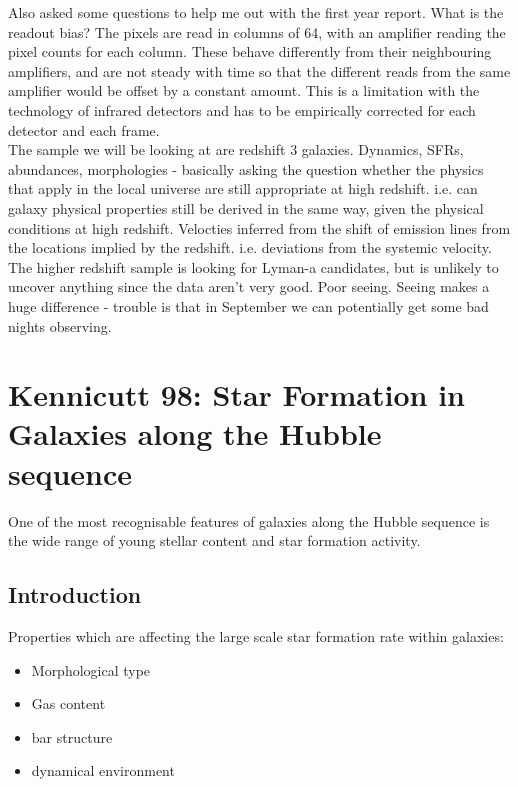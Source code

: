 \documentclass{literature}
\begin{document}
Also asked some questions to help me out with the first year report. What is the readout bias? The pixels are read in columns of 64, with an amplifier reading the pixel counts for each column. These behave differently from their neighbouring amplifiers, and are not steady with time so that the different reads from the same amplifier would be offset by a constant amount. This is a limitation with the technology of infrared detectors and has to be empirically corrected for each detector and each frame. \\ 
The sample we will be looking at are redshift 3 galaxies. Dynamics, SFRs, abundances, morphologies - basically asking the question whether the physics that apply in the local universe are still appropriate at high redshift. i.e. can galaxy physical properties still be derived in the same way, given the physical conditions at high redshift. Velocties inferred from the shift of emission lines from the locations implied by the redshift. i.e. deviations from the systemic velocity. The higher redshift sample is looking for Lyman-a candidates, but is unlikely to uncover anything since the data aren't very good. Poor seeing. Seeing makes a huge difference - trouble is that in September we can potentially get some bad nights observing.




\section{Kennicutt 98: Star Formation in Galaxies along the Hubble sequence}
One of the most recognisable features of galaxies along the Hubble sequence is the wide range of young stellar content and star formation activity. 
\subsection{Introduction}
Properties which are affecting the large scale star formation rate within galaxies: 
\begin{itemize}
\item Morphological type 
\item Gas content 
\item bar structure 
\item dynamical environment
\end{itemize}
\end{document}
